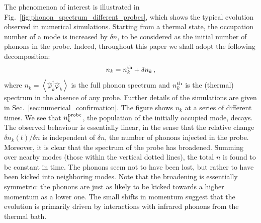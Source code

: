 \documentclass[aps,prd,notitlepage,amsfonts,amssymb,amsmath,nofootinbib,superscriptaddress,longbibliography]{revtex4-2}
\begin{document}
The phenomenon of interest is illustrated in Fig.~\ref{fig:phonon_spectrum_different_probes}, which shows the typical evolution observed in numerical simulations.  Starting from a thermal state, the occupation number of a mode is increased by  $\delta n$, to be considered as the initial number of phonons in the probe.  Indeed, throughout this paper we shall adopt the following decomposition:
\begin{equation}
    n_{k} = n_{k}^{\rm th} + \delta n_{k} \,,
    \label{eq:nk_decomposition}
\end{equation}
where $n_{k} = \left\langle \hat{\varphi}_{k}^{\dagger}\hat{\varphi}_{k} \right\rangle$ is the full phonon spectrum and $n_{k}^{\rm th}$ is the (thermal) spectrum in the absence of any probe.
Further details of the simulations are given in Sec.~\ref{sec:numerical_confirmation}. The figure shows $n_{k}$ at a series of different times.  
We see that $n_{k}^{\rm probe}$, the population of the initially occupied mode, decays. The observed behaviour is essentially linear, in the sense that the relative change $\delta n_{k}(t) / \delta n$ is independent of $\delta n$, the number of phonons injected in the probe. Moreover,
it is clear that the spectrum of the probe has broadened.  Summing over nearby modes (those within the vertical dotted lines), the total $n$ is found to be constant in time. The phonons seem not to have been lost, but rather to have been kicked into neighboring modes.  
Note that the broadening is essentially symmetric: the phonons are just as likely to be kicked towards a higher momentum as a lower one.
The small shifts in momentum suggest that the evolution is primarily driven by interactions with infrared phonons from the thermal bath. 
\end{document}
